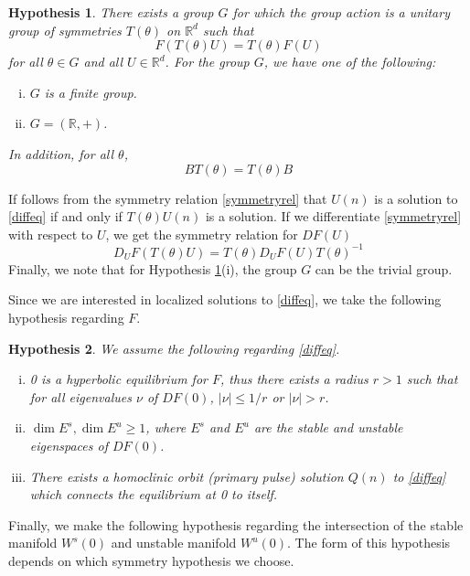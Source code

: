 \documentclass[12pt]{article}
\def\R{{\mathbb R}}
\newtheorem{hypothesis}{Hypothesis}
\begin{document}
\begin{hypothesis}\label{symmetryhyp}
There exists a group $G$ for which the group action is a unitary group of symmetries $T(\theta)$ on $\R^d$ such that 
\begin{equation}\label{symmetryrel}
F(T(\theta)U) = T(\theta)F(U)
\end{equation}
for all $\theta \in G$ and all $U \in \R^d$. For the group $G$, we have one of the following:
\begin{enumerate}[(i)]
\item $G$ is a finite group.
\item $G = (\R, +)$.
\end{enumerate}
In addition, for all $\theta$, 
\begin{equation}\label{BTcommute}
B T(\theta) = T(\theta) B
\end{equation}
\end{hypothesis}
If follows from the symmetry relation \eqref{symmetryrel} that $U(n)$ is a solution to \eqref{diffeq} if and only if $T(\theta)U(n)$ is a solution. If we differentiate \eqref{symmetryrel} with respect to $U$, we get the symmetry relation for $DF(U)$
\begin{equation}\label{DFtheta}
D_U F(T(\theta)U) = T(\theta) D_U F(U)T(\theta)^{-1}
\end{equation}
Finally, we note that for Hypothesis \ref{symmetryhyp}(i), the group $G$ can be the trivial group. 

Since we are interested in localized solutions to \eqref{diffeq}, we take the following hypothesis regarding $F$.

\begin{hypothesis}\label{initialhyp}
We assume the following regarding \eqref{diffeq}.
\begin{enumerate}[(i)]
\item 0 is a hyperbolic equilibrium for $F$, thus there exists a radius $r > 1$ such that for all eigenvalues $\nu$ of $DF(0)$, $|\nu| \leq 1/r$ or $|\nu| > r$.
\item $\dim E^s, \dim E^u \geq 1$, where $E^s$ and $E^u$ are the stable and unstable eigenspaces of $DF(0)$.
\item There exists a homoclinic orbit (primary pulse) solution $Q(n)$ to \eqref{diffeq} which connects the equilibrium at 0 to itself.
\end{enumerate}
\end{hypothesis}

Finally, we make the following hypothesis regarding the intersection of the stable manifold $W^s(0)$ and unstable manifold $W^u(0)$. The form of this hypothesis depends on which symmetry hypothesis we choose.
\end{document}

